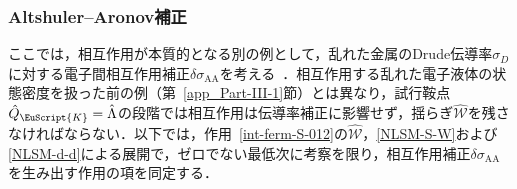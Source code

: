 \documentclass[a4paper,11pt]{ltjsarticle}
\def\Qk{\hat{Q}_{\EuScript{K}}}
\begin{document}
\subsubsection{Altshuler--Aronov補正}\label{app_Part-III-2}

ここでは，相互作用が本質的となる別の例として，乱れた金属のDrude伝導率$\sigma_{D}$に対する電子間相互作用補正$\delta\sigma_{\mathrm{AA}}$を考える~\cite{AltshulerAronov,AAL,AltshulerAronov-review}．相互作用する乱れた電子液体の状態密度を扱った前の例（第~\ref{app_Part-III-1}節）とは異なり，試行鞍点$\Qk=\hat{\Lambda}$の段階では相互作用は伝導率補正に影響せず，揺らぎ$\hat{\mathcal{W}}$を残さなければならない．以下では，作用~\eqref{int-ferm-S-012}の$\hat{\mathcal{W}}$，\eqref{NLSM-S-W}および\eqref{NLSM-d-d}による展開で，ゼロでない最低次に考察を限り，相互作用補正$\delta\sigma_{\mathrm{AA}}$を生み出す作用の項を同定する．
\end{document}

